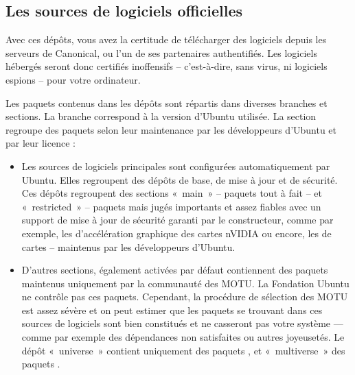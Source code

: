 {\subsection{Les sources de logiciels officielles}
Avec ces dépôts, vous avez la certitude de télécharger des logiciels depuis les serveurs de Canonical, ou l'un de ses partenaires authentifiés. Les logiciels hébergés seront donc certifiés inoffensifs -- c'est-à-dire, sans virus, ni logiciels espions -- pour votre ordinateur.\par
Les paquets contenus dans les dépôts sont répartis dans diverses branches et sections. La branche correspond à la version d'Ubuntu utilisée. La section regroupe des paquets selon leur maintenance par les développeurs d'Ubuntu et par leur licence :\par
\begin{itemize}
\item Les sources de logiciels principales sont configurées automatiquement par Ubuntu. Elles regroupent des dépôts de base, de mise à jour et de sécurité. Ces dépôts regroupent des sections «~main~» -- paquets tout à fait  -- et «~restricted~» -- paquets  mais jugés importants et assez fiables avec un support de mise à jour de sécurité garanti par le constructeur, comme par exemple, les  d'accélération graphique des cartes nVIDIA ou encore, les  de cartes  -- maintenus par les développeurs d'Ubuntu.
\item D'autres sections, également activées par défaut contiennent des paquets maintenus uniquement par la communauté des MOTU. La Fondation Ubuntu ne contrôle pas ces paquets. Cependant, la procédure de sélection des MOTU est assez sévère et on peut estimer que les paquets se trouvant dans ces sources de logiciels sont bien constitués et ne casseront pas votre système --- comme par exemple des dépendances non satisfaites ou autres joyeusetés. Le dépôt «~universe~» contient uniquement des paquets , et «~multiverse~» des paquets .%

\end{itemize}}
